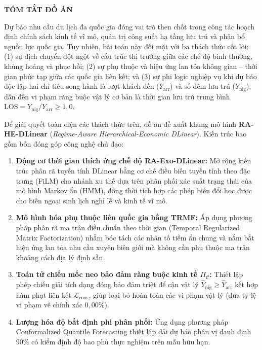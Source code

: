 \thispagestyle{empty}
\begin{center}
  {\fontsize{14pt}{18pt}\selectfont \textbf{TÓM TẮT ĐỒ ÁN}}\\[20pt]
\end{center}

Dự báo nhu cầu du lịch đa quốc gia đóng vai trò then chốt trong công tác hoạch định chính sách kinh tế vĩ mô, quản trị công suất hạ tầng lưu trú và phân bổ nguồn lực quốc gia. Tuy nhiên, bài toán này đối mặt với ba thách thức cốt lõi: (1) sự dịch chuyển đột ngột về cấu trúc thị trường giữa các chế độ bình thường, khủng hoảng và phục hồi; (2) sự phụ thuộc và hiệu ứng lan tỏa không gian -- thời gian phức tạp giữa các quốc gia liên kết; và (3) sự phi logic nghiệp vụ khi dự báo độc lập hai chỉ tiêu song hành là lượt khách đến ($Y_{\text{arr}}$) và số đêm lưu trú ($Y_{\text{nig}}$), dẫn đến vi phạm ràng buộc vật lý cơ bản là thời gian lưu trú trung bình $\text{LOS} = Y_{\text{nig}} / Y_{\text{arr}} \ge 1{,}0$.

Để giải quyết toàn diện các thách thức trên, đồ án đề xuất khung mô hình \textbf{RA-HE-DLinear} (\textit{Regime-Aware Hierarchical-Economic DLinear}). Kiến trúc bao gồm bốn đóng góp công nghệ chủ đạo:
\begin{enumerate}
    \item \textbf{Động cơ thời gian thích ứng chế độ RA-Exo-DLinear:} Mở rộng kiến trúc phân rã tuyến tính DLinear bằng cơ chế điều biến tuyến tính theo đặc trưng (FiLM) cho nhánh xu thế dựa trên phân phối xác suất trạng thái của mô hình Markov ẩn (HMM), đồng thời tích hợp các phép biến đổi học được cho biến ngoại sinh lịch nghỉ lễ và kinh tế vĩ mô.
    \item \textbf{Mô hình hóa phụ thuộc liên quốc gia bằng TRMF:} Áp dụng phương pháp phân rã ma trận điều chuẩn theo thời gian (Temporal Regularized Matrix Factorization) nhằm bóc tách các nhân tố tiềm ẩn chung và nắm bắt hiệu ứng lan tỏa nhu cầu xuyên biên giới mà không cần phụ thuộc ma trận khoảng cách địa lý định sẵn.
    \item \textbf{Toán tử chiếu mốc neo bảo đảm ràng buộc kinh tế $\Pi_{\mathcal{C}}$:} Thiết lập phép chiếu giải tích dạng đóng bảo đảm triệt để cận vật lý $\hat{Y}_{\text{nig}} \ge \hat{Y}_{\text{arr}}$ kết hợp hàm phạt liên kết $\mathcal{L}_{\text{cons}}$, giúp loại bỏ hoàn toàn các vi phạm vật lý (đưa tỷ lệ vi phạm về chính xác $0{,}00\%$).
    \item \textbf{Lượng hóa độ bất định phi phân phối:} Ứng dụng phương pháp Conformalized Quantile Forecasting thiết lập dải dự báo phân vị danh định 90\% có kiểm định độ bao phủ thực nghiệm trên mẫu hữu hạn.
\end{enumerate}

